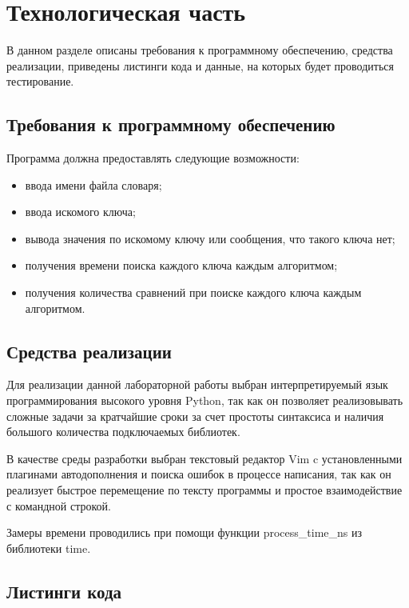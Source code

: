 \chapter{Технологическая часть}

В данном разделе описаны требования к программному обеспечению, средства
реализации, приведены листинги кода и данные, на которых будет проводиться
тестирование.

\section{Требования к программному обеспечению}

Программа должна предоставлять следующие возможности:
\begin{itemize}[left=\parindent]
    \item ввода имени файла словаря;
    \item ввода искомого ключа;
    \item вывода значения по искомому ключу или сообщения, что такого ключа
          нет;
    \item получения времени поиска каждого ключа каждым алгоритмом;
    \item получения количества сравнений при поиске каждого ключа каждым
          алгоритмом.
\end{itemize}

\section{Средства реализации}

Для реализации данной лабораторной работы выбран интерпретируемый язык
программирования высокого уровня Python\cite{python}, так как он позволяет
реализовывать сложные задачи за кратчайшие сроки за счет простоты синтаксиса и
наличия большого количества подключаемых библиотек. 

В качестве среды разработки выбран текстовый редактор Vim\cite{vim} c
установленными плагинами автодополнения и поиска ошибок в процессе написания,
так как он реализует быстрое перемещение по тексту программы и простое
взаимодействие с командной строкой.

Замеры времени проводились при помощи функции process\_time\_ns из библиотеки
time\cite{time}.

\newpage
\section{Листинги кода}

